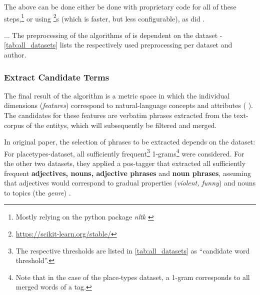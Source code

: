 The above can be done either be done with proprietary code for all of these steps,\footnote{Mostly relying on the python package \emph{nltk} \cite{bird2009natural}} or using \footnote{\url{https://scikit-learn.org/stable/}}s  (which is faster, but less configurable), as did \cite{Ager2018}.





... The preprocessing of the algorithms of \mainalgos is dependent on the dataset - \autoref{tab:all_datasets} lists the respectively used preprocessing per dataset and author.


\subsubsection{Extract Candidate Terms}
\label{sec:extract_cands}

The final result of the algorithm is a metric space in which the individual dimensions (\emph{\glspl{feature}}) correspond to natural-language concepts and attributes ( \cite{Derrac2015}). The candidates for these features are verbatim phrases extracted from the text-corpus of the \glspl{entity}, which will subsequently be filtered and merged.

In  original paper, the selection of phrases to be extracted depends on the dataset: For placetypes-dataset, all sufficiently frequent\footnote{\label{fnote:cand_thresholds}The respective thresholds are listed in \autoref{tab:all_datasets} as ``candidate word threshold''.} 1-grams\footnote{Note that in the case of the place-types dataset, a 1-gram corresponds to all merged words of a tag.} were considered. For the other two datasets, they applied a \gls{pos}-tagger that extracted all sufficiently frequent \textbf{adjectives, nouns, adjective phrases} and \textbf{noun phrases}, assuming that adjectives would correspond to gradual properties (\eg \textit{violent, funny}) and nouns to topics (\eg the \textit{genre}) \cite[Sec. 4.2.1]{Derrac2015}.

